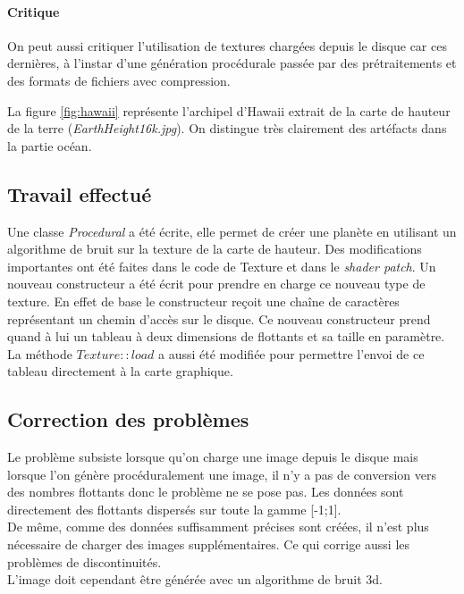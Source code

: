     \paragraph{Critique} On peut aussi critiquer l'utilisation de textures chargées depuis le disque car ces dernières, à l'instar d'une génération procédurale passée par des prétraitements et des formats de fichiers avec compression.
    
    
    La figure \ref{fig:hawaii} représente l'archipel d'Hawaii extrait de la carte de hauteur de la terre
    (\textit{EarthHeight16k.jpg}). On distingue très clairement des artéfacts dans la partie océan.
    
    \newpage
    \subsection{Travail effectué}
    Une classe \emph{Procedural} a été écrite, elle permet de créer une planète en utilisant un algorithme de bruit
    sur la texture de la carte de hauteur.
    Des modifications importantes ont été faites dans le code de Texture et dans le \emph{shader patch}.
    Un nouveau constructeur a été écrit pour prendre en charge ce nouveau type de texture. En effet de 
    base le constructeur reçoit une chaîne de caractères représentant un chemin d'accès sur le disque.
    Ce nouveau constructeur prend quand à lui un tableau à deux dimensions de flottants et sa taille en paramètre.\\
    La méthode $Texture::load$ a aussi été modifiée pour permettre l'envoi de ce tableau directement à la carte graphique.\\
    
    \subsection{Correction des problèmes}
    Le problème subsiste lorsque qu'on charge une image depuis le disque mais lorsque l'on génère procéduralement une image,
    il n'y a pas de conversion vers des nombres flottants donc le problème ne se pose pas. Les données sont directement des flottants dispersés sur toute la gamme [-1;1].\\
    De même, comme des données suffisamment précises sont créées, il n'est plus nécessaire de charger des images supplémentaires. Ce qui corrige aussi les problèmes de discontinuités.\\
    L'image doit cependant être générée avec un algorithme de bruit 3d.\\
    
